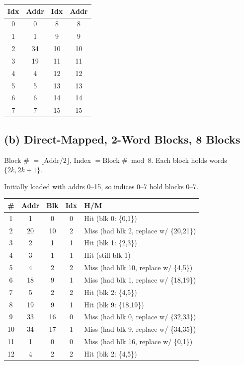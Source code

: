 \documentclass[11pt]{article}
\begin{document}
\begin{center}
\begin{tabular}{|c|c||c|c|}
\hline
\textbf{Idx} & \textbf{Addr} & \textbf{Idx} & \textbf{Addr} \\
\hline
0 & 0 & 8 & 8 \\
1 & 1 & 9 & 9 \\
2 & 34 & 10 & 10 \\
3 & 19 & 11 & 11 \\
4 & 4 & 12 & 12 \\
5 & 5 & 13 & 13 \\
6 & 6 & 14 & 14 \\
7 & 7 & 15 & 15 \\
\hline
\end{tabular}
\end{center}

\newpage
\subsection*{(b) Direct-Mapped, 2-Word Blocks, 8 Blocks}

Block \# $= \lfloor \text{Addr} / 2 \rfloor$, \quad Index $= \text{Block \#} \bmod 8$. Each block holds words $\{2k, 2k{+}1\}$.

Initially loaded with addrs 0--15, so indices 0--7 hold blocks 0--7.

\medskip
\begin{center}
\begin{tabular}{|c|c|c|c|l|}
\hline
\textbf{\#} & \textbf{Addr} & \textbf{Blk} & \textbf{Idx} & \textbf{H/M} \\
\hline
1 & 1 & 0 & 0 & Hit (blk 0: \{0,1\}) \\
2 & 20 & 10 & 2 & Miss (had blk 2, replace w/ \{20,21\}) \\
3 & 2 & 1 & 1 & Hit (blk 1: \{2,3\}) \\
4 & 3 & 1 & 1 & Hit (still blk 1) \\
5 & 4 & 2 & 2 & Miss (had blk 10, replace w/ \{4,5\}) \\
6 & 18 & 9 & 1 & Miss (had blk 1, replace w/ \{18,19\}) \\
7 & 5 & 2 & 2 & Hit (blk 2: \{4,5\}) \\
8 & 19 & 9 & 1 & Hit (blk 9: \{18,19\}) \\
9 & 33 & 16 & 0 & Miss (had blk 0, replace w/ \{32,33\}) \\
10 & 34 & 17 & 1 & Miss (had blk 9, replace w/ \{34,35\}) \\
11 & 1 & 0 & 0 & Miss (had blk 16, replace w/ \{0,1\}) \\
12 & 4 & 2 & 2 & Hit (blk 2: \{4,5\}) \\
\hline
\end{tabular}
\end{center}
\end{document}
